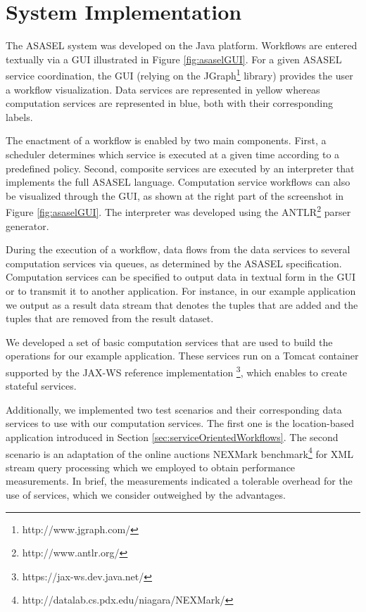 
\section{System Implementation} \label{sec:asasel:demo}
	
The ASASEL system was developed on the Java platform. Workflows are entered textually via a GUI illustrated in Figure \ref{fig:asaselGUI}. For a given ASASEL service coordination, the GUI (relying on the JGraph\footnote{http://www.jgraph.com/} library) provides the user a workflow visualization. Data services are represented in yellow whereas computation services are represented in blue, both with their corresponding labels.

The enactment of a workflow is enabled by two main components. First, a scheduler determines which service is executed at a given time according to a predefined policy. Second, composite services are executed by an interpreter that implements the full ASASEL language. Computation service workflows can also be visualized through the GUI, as shown at the right part of the screenshot in Figure \ref{fig:asaselGUI}. The interpreter was developed using the ANTLR\footnote{http://www.antlr.org/} parser generator.
	
During the execution of a workflow, data flows from the data services to several computation services via queues, as determined by the ASASEL specification. Computation services can be specified to output data in textual form in the GUI or to transmit it to another application. For instance, in our example application we output as a result data stream that denotes the tuples that are added and the tuples that are removed from the result dataset.
	
We developed a set of basic computation services that are used to build the operations for our example application. These services run on a Tomcat container supported by the JAX-WS reference implementation \footnote{https://jax-ws.dev.java.net/}, which enables to create stateful services.
	
Additionally, we implemented two test scenarios and their corresponding data services to use with our computation services. The first one is the location-based application introduced in Section \ref{sec:serviceOrientedWorkflows}. The second scenario is an adaptation of the online auctions NEXMark benchmark\footnote{http://datalab.cs.pdx.edu/niagara/NEXMark/} for XML stream query processing which we employed to obtain performance measurements. In brief, the measurements indicated a tolerable overhead for the use of services, which we consider outweighed by the advantages.
	
